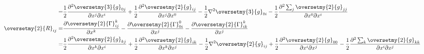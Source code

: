 \begin{subequations}
\begin{align}
       =&\frac{1}{2}\frac{\partial^2 \oversetmy{3}{g}_{0j}} {\partial x^j\partial x^i}
       + \frac{1}{2}\frac{\partial^2 \oversetmy{2}{g}_{ij}} {\partial x^j\partial x^0}
       - \frac{1}{2} \nabla^2 \oversetmy{3}{g}_{0i}
       -\frac{1}{2}\frac{\partial^2 \sum_{j}\oversetmy{2}{g}_{jj} }{\partial x^0\partial x^i} \\
    \oversetmy{2}{R}_{ij} =& \frac{\partial \oversetmy{2}{\Gamma}^k_{ij}}{\partial x^k}
       -\frac{\partial \oversetmy{2}{\Gamma}^0_{0i}}{\partial x^j}
       -\frac{\partial \oversetmy{2}{\Gamma}^k_{ik}}{\partial x^j} \notag \\
       =&\frac{1}{2}\frac{\partial^2 \oversetmy{2}{g}_{kj}} {\partial x^k \partial x^i}
       + \frac{1}{2}\frac{\partial^2 \oversetmy{2}{g}_{ik}} {\partial x^k \partial x^j}
       - \frac{1}{2}\nabla^2 \oversetmy{2}{g}_{ij}
       +\frac{1}{2}\frac{\partial^2 \oversetmy{2}{g}_{00}} {\partial x^i\partial x^j}
       -\frac{1}{2}\frac{\partial^2 \sum_{k}\oversetmy{2}{g}_{kk} }{\partial x^i\partial x^j}
\end{align}
\end{subequations}


